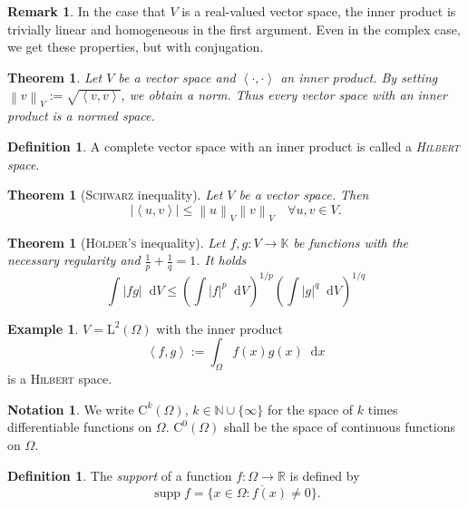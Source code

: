 \documentclass[12pt,a4paper,twoside, open=right]{scrreprt}
\theoremstyle{definition}
\newtheorem{rem}[auf]{Remark}
\newtheorem{defn}[auf]{Definition}
\newtheorem{bsp}[auf]{Example}
\newtheorem{notation}[auf]{Notation}
\theoremstyle{plain}
\newtheorem{sa}[auf]{Theorem}
\DeclareMathOperator{\supp}{supp} %
\newcommand{\abs}[1]{\left\vert #1\right\vert}
\newcommand{\dotp}[2]{\left\langle #1,#2\right\rangle}
\newcommand{\rr}{\mathbb{R}}
\newcommand{\kk}{\mathbb{K}}
\newcommand{\nn}{\mathbb{N}}
\newcommand{\norm}[1]{\left\lVert#1\right\rVert}
\newcommand{\D}{\mathop{}\!\mathrm{d}}
\begin{document}
\begin{rem}
    In the case that $V$ is a real-valued vector space, the inner product is trivially linear and homogeneous in the first argument. Even in the complex case, we get these properties, but with conjugation.
\end{rem}
\begin{sa}
    Let $V$ be a vector space and $\dotp{\cdot}{\cdot}$ an inner product. By setting $\norm{v}_V:=\sqrt{\dotp{v}{v}}$, we obtain a norm. Thus every vector space with an inner product is a normed space.
\end{sa}
\begin{defn}
    A complete vector space with an inner product is called a \emph{\textsc{Hilbert} space}.
\end{defn}
\begin{sa}[\textsc{Schwarz} inequality]
    \label{sa:Schwarz}
    Let $V$ be a vector space. Then 
    \begin{equation}
        \abs{\dotp{u}{v}}\le\norm{u}_V\norm{v}_V\quad \forall u,v\in V.
    \end{equation}
\end{sa}
\begin{sa}[\textsc{Hölder's} inequality]
    \label{sa:hoelder}
    Let $f,g \colon V\to\kk$ be functions with the necessary regularity and $\frac{1}{p}+\frac{1}{q}=1$. It holds
    \begin{equation}
        \int\abs{fg}\D V\le\left(\int\abs{f}^p\D V\right)^{1/p}\left(\int\abs{g}^q\D V\right)^{1/q}
    \end{equation}
\end{sa}
\begin{bsp}
    $V=\mathrm{L}^2(\Omega)$ with the inner product
    \begin{equation}
       \dotp{f}{g}:=\int_\Omega f(x)g(x)\D x
    \end{equation}
    is a \textsc{Hilbert} space.
\end{bsp}
\begin{notation}
    We write $\mathrm{C}^k(\Omega)$, $k\in\nn\cup\{\infty\}$ for the space of $k$ times differentiable functions on $\Omega$. $\mathrm{C}^0(\Omega)$ shall be the space of continuous functions on $\Omega$.
\end{notation}
\begin{defn}
    The \emph{support} of a function $f\colon \Omega\to\rr$ is defined by 
    \begin{equation}
        \supp f = \overline{\{x\in\Omega\colon f(x)\neq 0\}}.
    \end{equation}
\end{defn}
\end{document}
